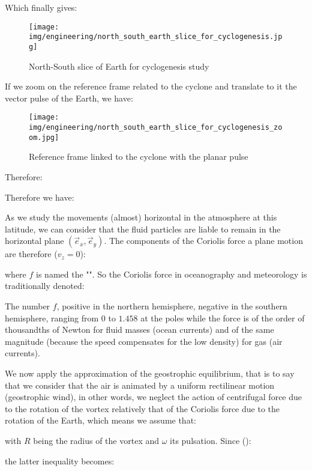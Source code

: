 	Which finally gives:
	
	\begin{figure}[H]
		\begin{center}
			\texttt{[image: img/engineering/north\_south\_earth\_slice\_for\_cyclogenesis.jpg]}
		\end{center}	
		\caption[]{North-South slice of Earth for cyclogenesis study}
	\end{figure}
	If we zoom on the reference frame related to the cyclone and translate to it the vector pulse of the Earth, we have:
	\begin{figure}[H]
		\begin{center}
			\texttt{[image: img/engineering/north\_south\_earth\_slice\_for\_cyclogenesis\_zoom.jpg]}
		\end{center}	
		\caption[]{Reference frame linked to the cyclone with the planar pulse}
	\end{figure}
	Therefore:
	
	Therefore we have:
	
	As we study the movements (almost) horizontal in the atmosphere at this latitude, we can consider that the fluid particles are liable to remain in the horizontal plane $(\vec{e}_x,\vec{e}_y)$. The components of the Coriolis force a plane motion are therefore ($v_z=0$):
	
	where $f$ is named the "". So the Coriolis force in oceanography and meteorology is traditionally denoted:
	
	The number $f$, positive in the northern hemisphere, negative in the southern hemisphere, ranging from $0$ to $1.458$ at the poles while the force is of the order of thousandths of Newton for fluid masses (ocean currents) and of the same magnitude (because the speed compensates for the low density) for gas (air currents).
	
	We now apply the approximation of the geostrophic equilibrium, that is to say that we consider that the air is animated by a uniform rectilinear motion (geostrophic wind), in other words, we neglect the action of centrifugal force due to the rotation of the vortex relatively that of the Coriolis force due to the rotation of the Earth, which means we assume that:
	
	with $R$ being the radius of the vortex and $\omega$ its pulsation. Since ():
	
	the latter inequality becomes:
	
